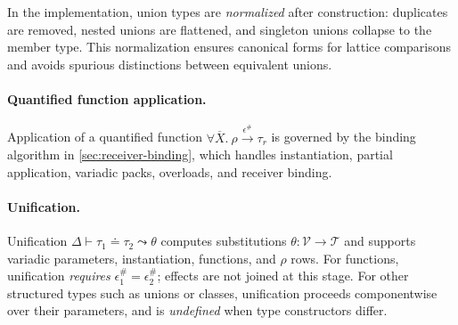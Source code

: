 In the implementation, union types are \emph{normalized} after construction: duplicates are removed, nested unions are flattened, and singleton unions collapse to the member type.  
This normalization ensures canonical forms for lattice comparisons and avoids spurious distinctions between equivalent unions.

\paragraph{Quantified function application.}
Application of a quantified function $\forall\overline{X}.~\rho \xrightarrow{\epsilon^\#} \tau_r$
is governed by the binding algorithm in \cref{sec:receiver-binding},
which handles instantiation, partial application, variadic packs, overloads, and receiver binding.
\paragraph{Unification.}  
Unification $\Delta \vdash \tau_1 \doteq \tau_2 \leadsto \theta$ computes substitutions $\theta : \mathcal{V} \to \mathcal{T}$ and supports variadic parameters, instantiation, functions, and $\rho$ rows.  
For functions, unification \emph{requires} $\epsilon^\#_1 = \epsilon^\#_2$; effects are not joined at this stage.  
For other structured types such as unions or classes, unification proceeds componentwise over their parameters, and is \emph{undefined} when type constructors differ.

